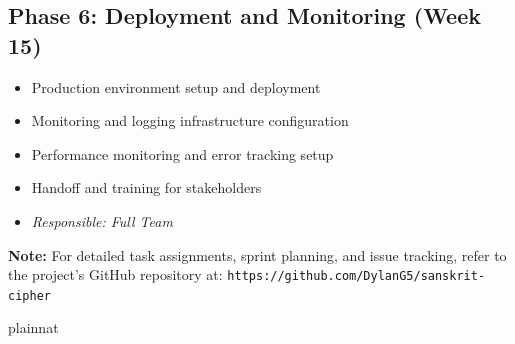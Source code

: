 \documentclass[12pt, titlepage]{article}
\begin{document}
\subsection{Phase 6: Deployment and Monitoring (Week 15)}

\begin{itemize}
    \item Production environment setup and deployment
    \item Monitoring and logging infrastructure configuration
    \item Performance monitoring and error tracking setup
    \item Handoff and training for stakeholders
    \item \textit{Responsible: Full Team}
\end{itemize}

\textbf{Note:} For detailed task assignments, sprint planning, and issue tracking, refer to the project's GitHub repository at: \texttt{https://github.com/DylanG5/sanskrit-cipher}

 {plainnat}


\newpage{}
\end{document}
